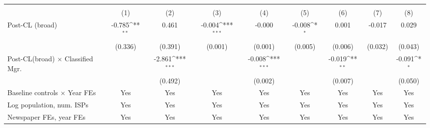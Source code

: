 {
\def\sym#1{\ifmmode^{#1}\else\(^{#1}\)\fi}
\begin{tabular}{l*{8}{c}}
\toprule
                    &&&&\\\cmidrule(lr){2-3}\cmidrule(lr){4-5}\cmidrule(lr){6-7}\cmidrule(lr){8-9}
                    &         &         &         &         &         &         &         &         \\
\midrule
Post-CL (broad)     &      -0.785\sym{**} &       0.461         &      -0.004\sym{***}&      -0.000         &      -0.008\sym{*}  &       0.001         &      -0.017         &       0.029         \\
                    &     (0.336)         &     (0.391)         &     (0.001)         &     (0.001)         &     (0.005)         &     (0.006)         &     (0.032)         &     (0.043)         \\
\addlinespace
Post-CL(broad) $\times$ Classified Mgr.&                     &      -2.861\sym{***}&                     &      -0.008\sym{***}&                     &      -0.019\sym{**} &                     &      -0.091\sym{*}  \\
                    &                     &     (0.492)         &                     &     (0.002)         &                     &     (0.007)         &                     &     (0.050)         \\
\addlinespace
Baseline controls $\times$ Year FEs &         Yes         &         Yes         &         Yes         &         Yes         &         Yes         &         Yes         &         Yes         &         Yes         \\
\addlinespace
Log population, num. ISPs &         Yes         &         Yes         &         Yes         &         Yes         &         Yes         &         Yes         &         Yes         &         Yes         \\
\addlinespace
Newspaper FEs, year FEs &         Yes         &         Yes         &         Yes         &         Yes         &         Yes         &         Yes         &         Yes         &         Yes         \\

\end{tabular}}
